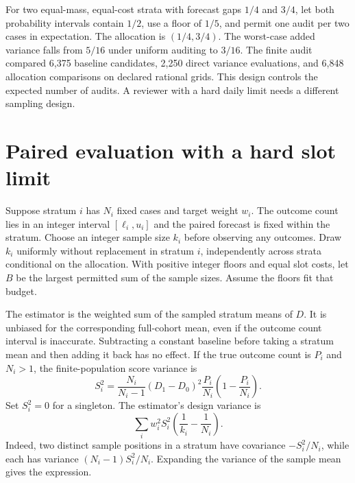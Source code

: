 \documentclass[11pt]{article}
\begin{document}
For two equal-mass, equal-cost strata with forecast gaps
$1/4$ and $3/4$, let both probability intervals contain
$1/2$, use a floor of $1/5$, and permit one audit per two
cases in expectation. The allocation is $(1/4,3/4)$.
The worst-case added variance falls from $5/16$ under
uniform auditing to $3/16$. The finite audit compared
6,375 baseline candidates, 2,250 direct variance evaluations,
and 6,848 allocation comparisons on declared rational grids.
This design controls the expected number of audits. A reviewer
with a hard daily limit needs a different sampling design.

\section{Paired evaluation with a hard slot limit}
Suppose stratum $i$ has $N_i$ fixed cases and target weight $w_i$.
The outcome count lies in an integer interval $[\ell_i,u_i]$ and
the paired forecast is fixed within the stratum. Choose an integer
sample size $k_i$ before observing any outcomes. Draw $k_i$
uniformly without replacement in stratum $i$, independently
across strata conditional on the allocation. With positive
integer floors and equal slot costs, let $B$ be the largest
permitted sum of the sample sizes. Assume the floors fit that
budget.

The estimator is the weighted sum of the sampled stratum means
of $D$. It is unbiased for the corresponding full-cohort mean,
even if the outcome count interval is inaccurate. Subtracting a
constant baseline before taking a stratum mean and then adding
it back has no effect. If the true outcome count is $P_i$ and
$N_i>1$, the finite-population score variance is
\[
 S_i^2=\frac{N_i}{N_i-1}(D_1-D_0)^2
       \frac{P_i}{N_i}\left(1-\frac{P_i}{N_i}\right).
\]
Set $S_i^2=0$ for a singleton. The estimator's design variance is
\[
 \sum_i w_i^2 S_i^2\left(\frac{1}{k_i}-\frac{1}{N_i}\right).
\]
Indeed, two distinct sample positions in a stratum have covariance
$-S_i^2/N_i$, while each has variance $(N_i-1)S_i^2/N_i$.
Expanding the variance of the sample mean gives the expression.
\end{document}

